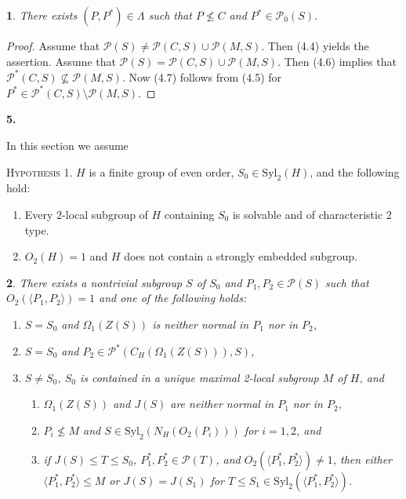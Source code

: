 \documentclass[11pt]{article}
\theoremstyle{plain}
\theoremstyle{stmplain}
\newtheorem{stm}{}[section]
\newcommand{\sect}[1]{\stepcounter{section}\par\vspace{14pt}%
  \begin{center}\textbf{#1.}\end{center}\vspace{2pt}}
\begin{document}
\begin{stm}\label{st:4.7}
There exists $(P, P^*) \in \Lambda$ such that $P \nleq C$ and $P^* \in
\mathcal{P}_0(S)$.
\end{stm}

\begin{proof}
Assume that $\mathcal{P}(S) \ne \mathcal{P}(C, S) \cup \mathcal{P}(M, S)$. Then
(4.4) yields the assertion. Assume that $\mathcal{P}(S) = \mathcal{P}(C, S)
\cup \mathcal{P}(M, S)$. Then (4.6) implies that $\mathcal{P}^*(C, S)
\nsubseteq \mathcal{P}(M, S)$. Now (4.7) follows from (4.5) for $P^* \in
\mathcal{P}^*(C, S) \setminus \mathcal{P}(M, S)$.
\end{proof}

\sect{5}

\noindent In this section we assume

\medskip
\noindent\textsc{Hypothesis 1.} \quad $H$ is a finite group of even order, $S_0 \in
\mathrm{Syl}_2(H)$, and the following hold:
\begin{enumerate}
\item[(i)] Every 2-local subgroup of $H$ containing $S_0$ is solvable and of
  characteristic 2 type.
\item[(ii)] $O_2(H) = 1$ and $H$ does not contain a strongly embedded subgroup.
\end{enumerate}

\begin{stm}\label{st:5.1}
There exists a nontrivial subgroup $S$ of $S_0$ and $P_1, P_2 \in \mathcal{P}(S)$
such that $O_2(\langle P_1, P_2 \rangle) = 1$ and one of the following holds:
\begin{enumerate}
\item[(a)] $S = S_0$ and $\Omega_1(Z(S))$ is neither normal in $P_1$ nor in
  $P_2$,
\item[(b)] $S = S_0$ and $P_2 \in \mathcal{P}^*(C_H(\Omega_1(Z(S))), S)$,
\item[(c)] $S \ne S_0$, $S_0$ is contained in a unique maximal 2-local subgroup
  $M$ of $H$, and
\begin{enumerate}
\item[(c$_1$)] $\Omega_1(Z(S))$ and $J(S)$ are neither normal in $P_1$ nor in
  $P_2$,
\item[(c$_2$)] $P_i \nleq M$ and $S \in \mathrm{Syl}_2(N_H(O_2(P_i)))$ for $i =
  1, 2$, and
\item[(c$_3$)] if $J(S) \le T \le S_0$, $P_1^*, P_2^* \in \mathcal{P}(T)$, and
  $O_2(\langle P_1^*, P_2^* \rangle) \ne 1$, then either $\langle P_1^*, P_2^*
  \rangle \le M$ or $J(S) = J(S_1)$ for $T \le S_1 \in \mathrm{Syl}_2(\langle
  P_1^*, P_2^* \rangle)$.
\end{enumerate}
\end{enumerate}
\end{stm}
\end{document}
